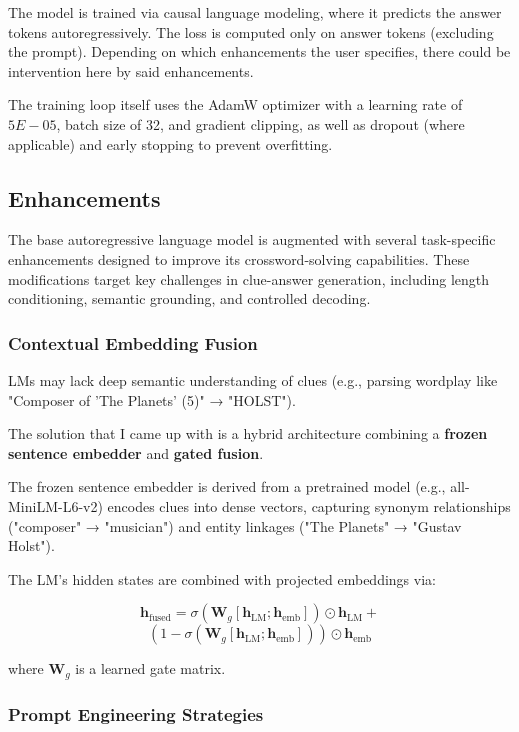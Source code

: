 \documentclass[
	a4paper, %
	10pt, %
	unnumberedsections, %
	twoside, %
]{LTJournalArticle}
\begin{document}
The model is trained via causal language modeling, where it predicts the answer tokens autoregressively. The loss is computed only on answer tokens (excluding the prompt). Depending on which enhancements the user specifies, there could be intervention here by said enhancements.

The training loop itself uses  the AdamW optimizer with a learning rate of $5E-05$, batch size of 32, and gradient clipping, as well as dropout (where applicable) and early stopping to prevent overfitting.

\subsection{Enhancements}

The base autoregressive language model is augmented with several task-specific enhancements designed to improve its crossword-solving capabilities. These modifications target key challenges in clue-answer generation, including length conditioning, semantic grounding, and controlled decoding.

\subsubsection{Contextual Embedding Fusion}
LMs may lack deep semantic understanding of clues (e.g., parsing wordplay like "Composer of 'The Planets' (5)" → "HOLST").

The solution that I came up with is a hybrid architecture combining a \textbf{frozen sentence embedder} and \textbf{gated fusion}.

The frozen sentence embedder is derived from a pretrained model (e.g., all-MiniLM-L6-v2) encodes clues into dense vectors, capturing synonym relationships ("composer" → "musician") and entity linkages ("The Planets" → "Gustav Holst").

The LM’s hidden states are combined with projected embeddings via:

\[\mathbf{h}_{\text{fused}} = \sigma\left(\mathbf{W}_g \left[\mathbf{h}_{\text{LM}}; \mathbf{h}_{\text{emb}}\right]\right) \odot \mathbf{h}_{\text{LM}} +\]
\[ \left(1 - \sigma\left(\mathbf{W}_g \left[\mathbf{h}_{\text{LM}}; \mathbf{h}_{\text{emb}}\right]\right)\right) \odot \mathbf{h}_{\text{emb}}\]

where $\mathbf{W}_g$ is a learned gate matrix.

\subsubsection{Prompt Engineering Strategies}
\end{document}
